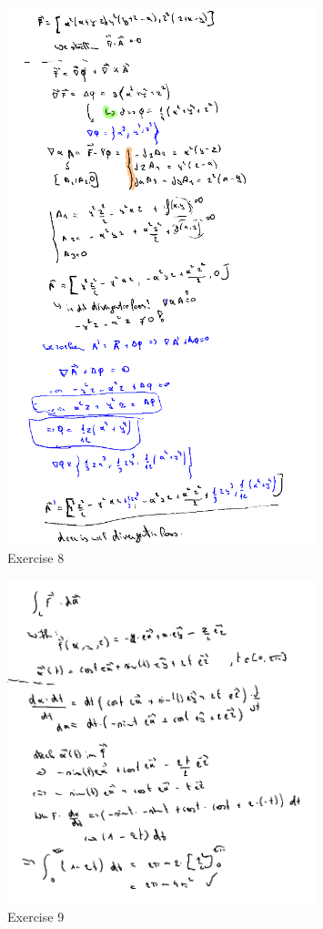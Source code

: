 \documentclass[a4paper]{article}
\begin{document}
\begin{figure}[H]
	\centering
	\includegraphics[width=0.8\textwidth]{assets/huis_6_ex_8.png}
	\caption{Exercise 8}
	\label{fig:huis_6_ex_8}
\end{figure}

\begin{figure}[H]
	\centering
	\includegraphics[width=0.8\textwidth]{assets/huis_6_ex_9.png}
	\caption{Exercise 9}
	\label{fig:huis_6_ex_9}
\end{figure}
\end{document}
